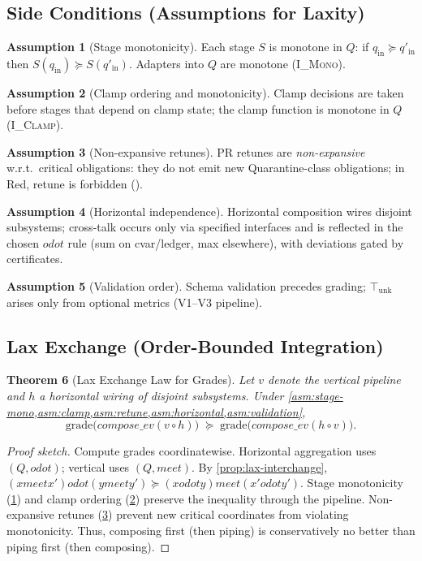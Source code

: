 \documentclass[11pt]{article}
\theoremstyle{plain}
\newtheorem{theorem}{Theorem}[section]
\theoremstyle{definition}
\newtheorem{assumption}[theorem]{Assumption}
\theoremstyle{remark}
\def\Q{Q}%
\def\Sig{\Sigma}%
\def\composeev{compose\_ev}%
\def\vmeet{meet}%
\def\hplus{odot}%
\def\code#1{#1}%
\DeclareRobustCommand{\Q}{\texorpdfstring{\ensuremath{\mathcal{Q}}}{Q}}     %
\DeclareRobustCommand{\Sig}{\texorpdfstring{\ensuremath{\Sigma}}{\Sigma}}   %
\DeclareMathOperator{\composeevOp}{compose\_ev}
\DeclareRobustCommand{\composeev}{\texorpdfstring{\ensuremath{\composeevOp}}{compose\_ev}}
\newcommand{\unk}{\top_{\mathrm{unk}}}         %
\newcommand{\vmeet}{\wedge}                    %
\newcommand{\hplus}{\odot}                     %
\newcommand{\geqQ}{\succeq}
\newcommand{\code}[1]{\texttt{\textup{#1}}}    %
\newcommand{\ledger}{\code{ledger}}
\newcommand{\cvar}{\code{cvar}}
\newcommand{\PR}{\textsc{PR}}
\newcommand{\IMono}{\textsc{I\_Mono}}
\newcommand{\IClamp}{\textsc{I\_Clamp}}
\def\Q{Q}%
\def\Sig{\Sigma}%
\def\composeev{compose\_ev}%
\def\vmeet{meet}%
\def\hplus{odot}%
\def\code#1{#1}%
\begin{document}
\subsection{Side Conditions (Assumptions for Laxity)}
\begin{assumption}[Stage monotonicity]\label{asm:stage-mono}
Each stage \(S\) is monotone in \(\Q\): if \(q_{\mathrm{in}}\geqQ q'_{\mathrm{in}}\) then \(S(q_{\mathrm{in}})\geqQ S(q'_{\mathrm{in}})\). Adapters into \(\Q\) are monotone (\IMono).
\end{assumption}
\begin{assumption}[Clamp ordering and monotonicity]\label{asm:clamp}
Clamp decisions are taken before stages that depend on clamp state; the clamp function is monotone in \(\Q\) (\IClamp).
\end{assumption}
\begin{assumption}[Non-expansive retunes]\label{asm:retune}
\PR{} retunes are \emph{non-expansive} w.r.t.\ critical obligations: they do not emit new \code{Quarantine}-class obligations; in Red, retune is forbidden (\Sig).
\end{assumption}
\begin{assumption}[Horizontal independence]\label{asm:horizontal}
Horizontal composition wires disjoint subsystems; cross-talk occurs only via specified interfaces and is reflected in the chosen \(\hplus\) rule (sum on \cvar/\ledger, max elsewhere), with deviations gated by \Sig{} certificates.
\end{assumption}
\begin{assumption}[Validation order]\label{asm:validation}
Schema validation precedes grading; \(\unk\) arises only from optional metrics (V1–V3 pipeline).
\end{assumption}

\subsection{Lax Exchange (Order-Bounded Integration)}
\begin{theorem}[Lax Exchange Law for Grades]\label{thm:lax-exchange}
Let \(v\) denote the vertical pipeline and \(h\) a horizontal wiring of disjoint subsystems. Under \cref{asm:stage-mono,asm:clamp,asm:retune,asm:horizontal,asm:validation},
\[
  \mathrm{grade}\big(\composeev(v\circ h)\big)\;\geqQ\;
  \mathrm{grade}\big(\composeev(h\circ v)\big).
\]
\end{theorem}
\begin{proof}[Proof sketch]
Compute grades coordinatewise. Horizontal aggregation uses \((\Q,\hplus)\); vertical uses \((\Q,\vmeet)\). By \cref{prop:lax-interchange}, \((x\vmeet x')\hplus(y\vmeet y') \geqQ (x\hplus y)\vmeet(x'\hplus y')\). Stage monotonicity (\cref{asm:stage-mono}) and clamp ordering (\cref{asm:clamp}) preserve the inequality through the pipeline. Non-expansive retunes (\cref{asm:retune}) prevent new critical coordinates from violating monotonicity. Thus, composing first (then piping) is conservatively no better than piping first (then composing).
\end{proof}
\end{document}
